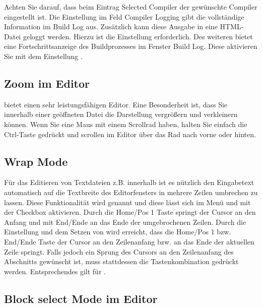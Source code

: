 Achten Sie darauf, dass beim Eintrag Selected Compiler der gewünschte Compiler eingestellt ist. Die Einstellung  im Feld Compiler Logging gibt die vollständige Information im Build Log aus. Zusätzlich kann diese Ausgabe in eine HTML-Datei geloggt werden. Hierzu ist die Einstellung  erforderlich.
Des weiteren bietet \codeblocks eine Fortschrittsanzeige des Buildprozesses im Fenster Build Log. Diese aktivieren Sie mit dem Einstellung .

\subsection{Zoom im Editor}

\codeblocks bietet einen sehr leistungsfähigen Editor. Eine Besonderheit ist, dass Sie innerhalb einer geöffneten Datei die Darstellung vergrößern und verkleinern können. Wenn Sie eine Maus mit einem Scrollrad haben, halten Sie einfach die Ctrl-Taste gedrückt und scrollen im Editor über das Rad nach vorne oder hinten.


\subsection{Wrap Mode}

Für das Editieren von Textdateien z.B.  innerhalb \codeblocks ist es nützlich den Eingabetext automatisch auf die Textbreite des Editorfensters in mehrere Zeilen umbrechen zu lassen. Diese Funktionalität wird  genannt und diese lässt sich im Menü  und mit der Checkbox  aktivieren. Durch die Home/Pos 1 Taste springt der Cursor an den Anfang und mit End/Ende an das Ende der umgebrochenen Zeilen. Durch die Einstellung  und dem Setzen von  wird erreicht, dass die Home/Pos 1 bzw. End/Ende Taste der Cursor an den Zeilenanfang bzw. an das Ende der aktuellen Zeile springt. Falls jedoch ein Sprung des Cursors an den Zeilenanfang des Abschnitts gewünscht ist, muss stattdessen die Tastenkombination  gedrückt werden. Entsprechendes gilt für .

\subsection{Block select Mode im Editor}

